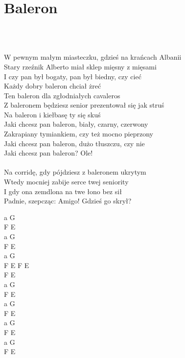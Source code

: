 \documentclass[a5paper, 10pt]{book}
\begin{document}
\newpage
\section{Baleron}\textcolor{lightgray}{\textit{}}\\~\\
\begin{minipage}[t]{0.8\textwidth}
W pewnym małym miasteczku, gdzieś na krańcach Albanii\\
Stary rzeźnik Alberto miał sklep mięsny z mięsami\\
I czy pan był bogaty, pan był biedny, czy cieć\\
Każdy dobry baleron chciał żreć\\

\hspace*{8mm}Ten baleron dla zgłodniałych cavaleros\\
\hspace*{8mm}Z baleronem będziesz senior prezentował się jak struś\\
\hspace*{8mm}Na baleron i kiełbasę ty się skuś\\

Jaki chcesz pan baleron, biały, czarny, czerwony\\
Zakrapiany tymiankiem, czy też mocno pieprzony\\
Jaki chcesz pan baleron, dużo tłuszczu, czy nie\\
Jaki chcesz pan baleron? Ole!\\
\\
Na corridę, gdy pójdziesz z baleronem ukrytym\\
Wtedy mocniej zabije serce twej seniority\\
I gdy ona zemdlona na twe łono bez sił\\
Padnie, szepcząc: Amigo! Gdzieś go skrył?\\
\end{minipage}
\begin{minipage}[t]{0.2\textwidth}
a G\\
F E\\
a G\\
F E\\

a G \\
F E F E\\
F E \\

a G\\
F E\\
a G\\
F E\\

a G\\
F E\\
a G\\
F E\\
\end{minipage}
\end{document}
